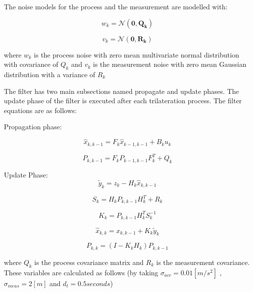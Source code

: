 The noise models for the process and the measurement are modelled with:

\begin{equation}
 w_k = \mathcal{N}(\mathbf{0,Q_k})
\end{equation}
	
\begin{equation}
v_k = \mathcal{N}(\mathbf{0,R_k})
\end{equation}
		
where $w_k$ is the process noise with zero mean multivariate normal distribution with covariance of $Q_k$ and $v_k$ is the measurement noise with zero mean Gaussian distribution with a variance of $R_k$
		
The filter has two main subsections named propagate and update phases. The update phase of the filter is executed after each trilateration process. The filter equations are as follows:
		
Propagation phase:

\begin{equation}
\hat{x}_{k,k-1} = F_k\hat{x}_{k-1,k-1} + B_ku_k
\end{equation}
		
\begin{equation}
 P_{k,k-1} = F_k P_{k-1,k-1}F^T_k + Q_k
\end{equation}
		
Update Phase:
\begin{equation}
\tilde{y}_k = z_k - H_k  \hat{x}_{k,k-1} 
\end{equation}

\begin{equation}
S_k = H_k P_{k,k-1} H^T_k + R_k
\end{equation}

\begin{equation}
K_k =  P_{k,k-1} H^T_kS_k^{-1}
\end{equation}
		
\begin{equation}
 \hat{x}_{k,k} =  \hat{x}_{k,k-1} + K_k \tilde{y}_k
\end{equation}
		
\begin{equation}
P_{k,k} = (I - K_kH_k)P_{k,k-1}
\end{equation}
		
where $Q_k$ is the process covariance matrix and $R_k$ is the measurement covariance. These variables are calculated as follows (by taking $\sigma_{acc} = 0.01[m/s^2]$ , $\sigma_{meas} = 2[m]$ and $d_t = 0.5 seconds$)


